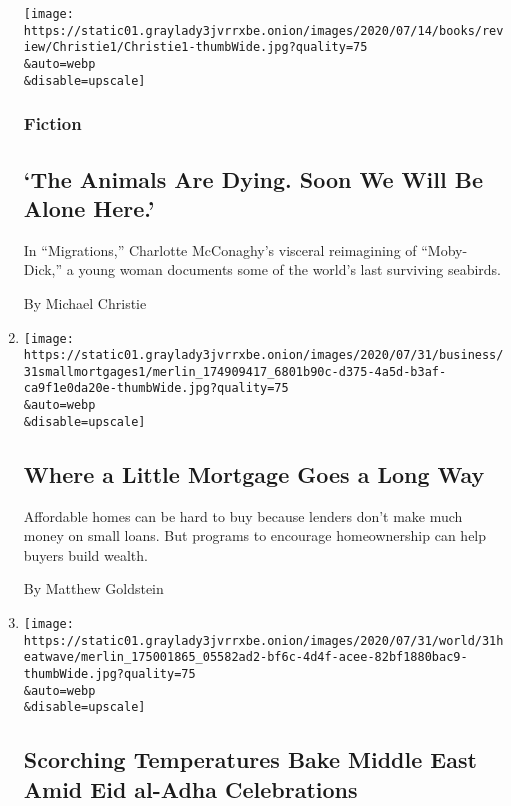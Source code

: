 \begin{enumerate}
  \texttt{[image: https://static01.graylady3jvrrxbe.onion/images/2020/07/14/books/review/Christie1/Christie1-thumbWide.jpg?quality=75\\\&auto=webp\\\&disable=upscale]}

  \hypertarget{fiction}{%
  \subsubsection{Fiction}\label{fiction}}

  \hypertarget{the-animals-are-dying-soon-we-will-be-alone-here}{%
  \subsection{`The Animals Are Dying. Soon We Will Be Alone
  Here.'}\label{the-animals-are-dying-soon-we-will-be-alone-here}}

  In ``Migrations,'' Charlotte McConaghy's visceral reimagining of
  ``Moby-Dick,'' a young woman documents some of the world's last
  surviving seabirds.

  By Michael Christie
\item
  \href{/2020/08/02/business/mortgages-affordable-housing.html}{}

  \texttt{[image: https://static01.graylady3jvrrxbe.onion/images/2020/07/31/business/31smallmortgages1/merlin\_174909417\_6801b90c-d375-4a5d-b3af-ca9f1e0da20e-thumbWide.jpg?quality=75\\\&auto=webp\\\&disable=upscale]}

  \hypertarget{where-a-little-mortgage-goes-a-long-way}{%
  \subsection{Where a Little Mortgage Goes a Long
  Way}\label{where-a-little-mortgage-goes-a-long-way}}

  Affordable homes can be hard to buy because lenders don't make much
  money on small loans. But programs to encourage homeownership can help
  buyers build wealth.

  By Matthew Goldstein
\item
  \href{/2020/07/31/world/middleeast/Middle-East-heat-wave.html}{}

  \texttt{[image: https://static01.graylady3jvrrxbe.onion/images/2020/07/31/world/31heatwave/merlin\_175001865\_05582ad2-bf6c-4d4f-acee-82bf1880bac9-thumbWide.jpg?quality=75\\\&auto=webp\\\&disable=upscale]}

  \hypertarget{scorching-temperatures-bake-middle-east-amid-eid-al-adha-celebrations}{%
  \subsection{Scorching Temperatures Bake Middle East Amid Eid al-Adha
  Celebrations}\label{scorching-temperatures-bake-middle-east-amid-eid-al-adha-celebrations}}


\end{enumerate}
